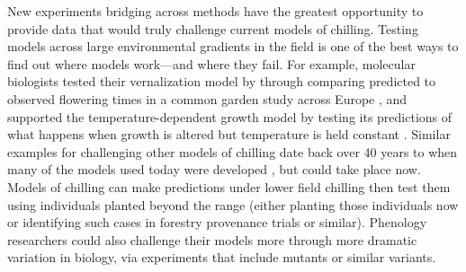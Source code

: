 \documentclass[11pt]{article}
\begin{document}
New experiments bridging across methods have the greatest opportunity to provide data that would truly challenge current models of chilling. Testing models across large environmental gradients in the field is one of the best ways to find out where models work---and where they fail. For example, molecular biologists tested their vernalization model by through comparing predicted to observed flowering times in a common garden study across Europe \citep[][]{Wilczek:2009oa}, and supported the temperature-dependent growth model by testing its predictions of what happens when growth is altered but temperature is held constant \citep{zhao2020temperature}. Similar examples for challenging other models of chilling date back over 40 years to when many of the models used today were developed \citep{richardson1974,chuine2016,ospreebbms}, but could take place now. Models of chilling can make predictions under lower field chilling then test them using individuals planted beyond the range (either planting those individuals now or identifying such cases in forestry provenance trials or similar). Phenology researchers could also challenge their models more through more dramatic variation in biology, via experiments that include mutants or similar variants. 
\end{document}
